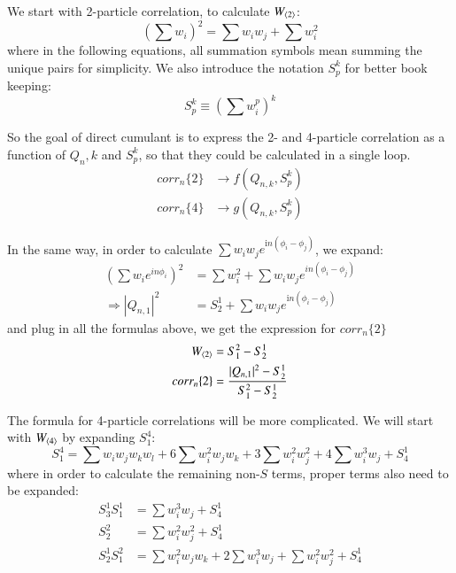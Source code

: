 We start with 2-particle correlation, to calculate $W_{\left\langle 2\right\rangle}$:
\begin{equation}
(\sum w_{i})^{2}=\sum w_{i}w_{j}+\sum w_{i}^{2}
\end{equation}
where in the following equations, all summation symbols mean summing the unique pairs for simplicity. We also introduce the notation $S_{p}^{k}$ for better book keeping:
\begin{equation}
S_{p}^{k}\equiv(\sum w_{i}^{p})^{k}
\end{equation}

So the goal of direct cumulant is to express the 2- and 4-particle correlation as a function of $Q_{n},k$ and $S_{p}^{k}$, so that they could be calculated in a single loop.
\begin{equation}
\begin{split}
corr_{n}\{2\}&\to f(Q_{n,k},S_{p}^{k}) \\
corr_{n}\{4\}&\to g(Q_{n,k},S_{p}^{k})
\end{split}
\end{equation}

In the same way, in order to calculate $\sum w_{i}w_{j}e^{\text{i}n(\phi_{i}-\phi_{j})}$, we expand:
\begin{equation}
\begin{split}
(\sum w_{i}e^{in\phi_{i}})^{2}&=\sum w_{i}^{2}+\sum w_{i}w_{j}e^{in(\phi_{i}-\phi_{j})} \\
\Rightarrow |Q_{n,1}|^{2}&=S_{2}^{1}+\sum w_{i}w_{j}e^{\text{i}n(\phi_{i}-\phi_{j})}
\end{split}
\end{equation}
and plug in all the formulas above, we get the expression for $corr_{n}\{2\}$
\begin{equation}
\begin{split}
W_{\left\langle 2\right\rangle}&=S_{1}^{2}-S_{2}^{1} \\
corr_{n}\{2\}&=\frac{|Q_{n,1}|^{2}-S_{2}^{1}}{S_{1}^{2}-S_{2}^{1}}
\end{split}
\end{equation}

The formula for 4-particle correlations will be more complicated. We will start with $W_{\left\langle 4\right\rangle}$ by expanding $S_{1}^{4}$:
\begin{equation}
S_{1}^{4} = \sum w_{i}w_{j}w_{k}w_{l}+6\sum w_{i}^{2}w_{j}w_{k}+3\sum w_{i}^{2}w_{j}^{2}+4\sum w_{i}^{3}w_{j}+S_{4}^{1}
\end{equation}
where in order to calculate the remaining non-$S$ terms, proper terms also need to be expanded:
\begin{equation}
\begin{split}
S_{3}^{1}S_{1}^{1}&=\sum w_{i}^{3}w_{j}+S_{4}^{1} \\
S_{2}^{2}&=\sum w_{i}^{2}w_{j}^{2}+S_{4}^{1} \\
S_{2}^{1}S_{1}^{2}&=\sum w_{i}^{2}w_{j}w_{k}+2\sum w_{i}^{3}w_{j}+\sum w_{i}^{2}w_{j}^{2}+S_{4}^{1}
\end{split}
\end{equation}

